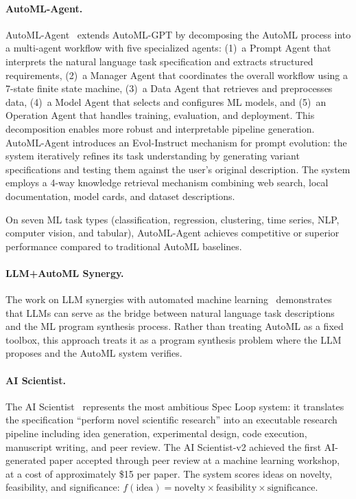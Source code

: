 \paragraph{AutoML-Agent.}
AutoML-Agent~\citep{chen2024automlagent} extends AutoML-GPT by decomposing the AutoML process into a multi-agent workflow with five specialized agents: (1)~a Prompt Agent that interprets the natural language task specification and extracts structured requirements, (2)~a Manager Agent that coordinates the overall workflow using a 7-state finite state machine, (3)~a Data Agent that retrieves and preprocesses data, (4)~a Model Agent that selects and configures ML models, and (5)~an Operation Agent that handles training, evaluation, and deployment. This decomposition enables more robust and interpretable pipeline generation. AutoML-Agent introduces an Evol-Instruct mechanism for prompt evolution: the system iteratively refines its task understanding by generating variant specifications and testing them against the user's original description. The system employs a 4-way knowledge retrieval mechanism combining web search, local documentation, model cards, and dataset descriptions.

On seven ML task types (classification, regression, clustering, time series, NLP, computer vision, and tabular), AutoML-Agent achieves competitive or superior performance compared to traditional AutoML baselines.

\paragraph{LLM+AutoML Synergy.}
The work on LLM synergies with automated machine learning~\citep{zheng2024llm_automl} demonstrates that LLMs can serve as the bridge between natural language task descriptions and the ML program synthesis process. Rather than treating AutoML as a fixed toolbox, this approach treats it as a program synthesis problem where the LLM proposes and the AutoML system verifies.

\paragraph{AI Scientist.}
The AI Scientist~\citep{lu2024aiscientist} represents the most ambitious Spec Loop system: it translates the specification ``perform novel scientific research'' into an executable research pipeline including idea generation, experimental design, code execution, manuscript writing, and peer review. The AI Scientist-v2 achieved the first AI-generated paper accepted through peer review at a machine learning workshop, at a cost of approximately \$15 per paper. The system scores ideas on novelty, feasibility, and significance: $f(\text{idea}) = \text{novelty} \times \text{feasibility} \times \text{significance}$.

